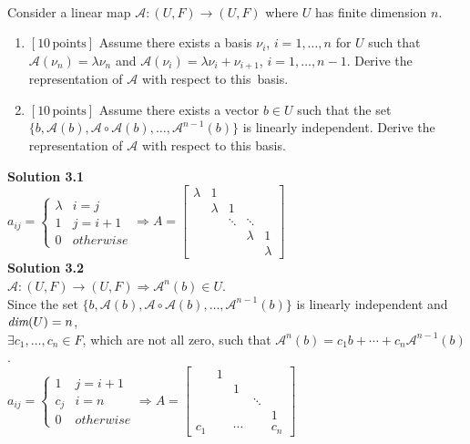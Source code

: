 \documentclass[fleqn, 10.5pt, a4paper]{article}
\newcommand\A{\mathcal{A}}
\theoremstyle{definition}
\numberwithin{equation}{section}
\renewcommand{\dim}{{\mbox{\em dim}}}
\begin{document}
\\
Consider a linear map $\A:(U,F) \rightarrow (U,F)$
where $U$ has finite dimension $n$. 
\begin{enumerate}
	\item {\bf$[10\, \text{points}]$} Assume there exists a basis
	$\nu_i$, $i=1, \ldots, n$ for $U$ such that ${\mathcal A}(\nu_n)=\lambda
	\nu_n$ and ${\mathcal A}(\nu_i)=\lambda \nu_i+\nu_{i+1}$, $i=1, \ldots,
	n-1$. Derive the representation of ${\mathcal A}$ with respect to this~basis.
	\item {\bf$[10\, \text{points}]$} Assume there exists a vector $b
	\in U$ such that the set $\{b, {\mathcal A}(b), {\mathcal
		A}\circ {\mathcal A}(b), \ldots, {\mathcal A}^{n-1}(b)\}$ is linearly independent. Derive the representation of ${\mathcal A}$
	with respect to this basis.\\
\end{enumerate}

{\bf Solution 3.1} \\

$a_{ij} = \begin{cases}
\lambda & i = j \\
1 & j = i + 1 \\
0 & otherwise
\end{cases} \Rightarrow A = \left[\begin{matrix}
\lambda & 1 & & & \\
& \lambda &1 & & \\
& & \ddots &\ddots & \\
& & & \lambda & 1 \\
& & & & \lambda
\end{matrix}\right]$ \\

{\bf Solution 3.2} \\

$\A:(U,F) \rightarrow (U,F) \Rightarrow \A^n(b) \in U$. \\
Since the set $\{b, {\A}(b), {\A} \circ {\A}(b), \ldots, {\A}^{n-1}(b)\}$ is linearly independent and $\dim(U) = n$, \\
$\exists c_1,\dots,c_n \in F$, which are not all zero, such that $\A^n(b) = c_1b + \cdots + c_n\A^{n-1}(b)$. \\

$a_{ij} = \begin{cases}
1 & j = i + 1 \\
c_j & i = n \\
0 & otherwise
\end{cases} \Rightarrow A = \left[\begin{matrix}
 & 1 & & & \\
&  &1 & & \\
& &  &\ddots & \\
& & &  & 1 \\
c_1 & & \cdots & & c_n
\end{matrix}\right]$
\end{document}
